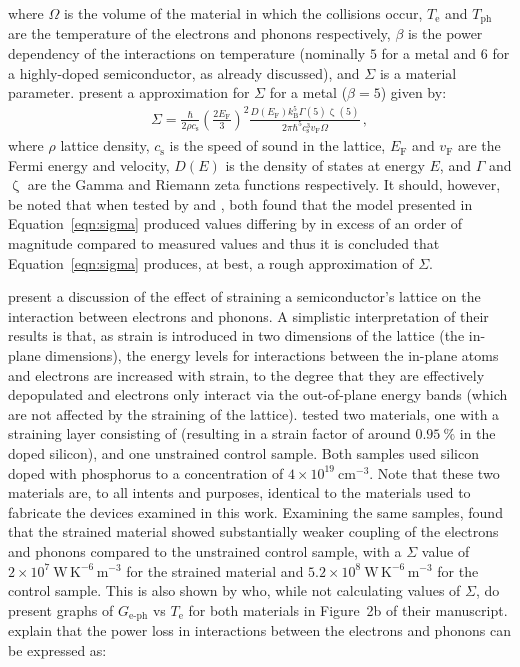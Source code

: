 where $\varOmega$ is the volume of the material in which the collisions occur, $T_{\mathrm{e}}$ and $T_{\mathrm{ph}}$ are the temperature of the electrons and phonons respectively, $\beta$ is the power dependency of the interactions on temperature (nominally $5$ for a metal and $6$ for a highly-doped semiconductor, as already discussed), and $\varSigma$ is a material parameter. \textcite{Wellstood1994} present a approximation for $\varSigma$ for a metal ($\beta = 5$) given by:
\begin{align}
\varSigma = \frac{\hbar}{2\rho c_{\mathrm{s}}}
	\left(\frac{2E_{\mathrm{F}}}{3}\right)^{2}
	\frac{D\left(E_{\mathrm{F}}\right)k_{\mathrm{B}}^{5}
		\Gamma\left(5\right)\upzeta\left(5\right)}
		{2\pi\hbar^{5}c_{\mathrm{s}}^{3}v_{\mathrm{F}}\Omega}\,,
\label{eqn:sigma}
\end{align}
where $\rho$ lattice density, $c_{\mathrm{s}}$ is the speed of sound in the lattice, $E_{\mathrm{F}}$ and $v_{\mathrm{F}}$ are the Fermi energy and velocity, $D\left(E\right)$ is the density of states at energy $E$, and $\Gamma$ and $\upzeta$ are the Gamma and Riemann zeta functions respectively. It should, however, be noted that when tested by \textcite{Wellstood1994} and \textcite{Qu2005}, both found that the model presented in Equation~\ref{eqn:sigma} produced values differing by in excess of an order of magnitude compared  to measured values and thus it is concluded that Equation~\ref{eqn:sigma} produces, at best, a rough approximation of $\varSigma$.
\par 
\textcite{Muhonen2011} present a discussion of the effect of straining a semiconductor's lattice on the interaction between electrons and phonons. A simplistic interpretation of their results is that, as strain is introduced in two dimensions of the lattice (the in-plane dimensions), the energy levels for interactions between the in-plane atoms and electrons are increased with strain, to the degree that they are effectively depopulated and electrons only interact via the out-of-plane energy bands (which are not affected by the straining of the lattice). \citeauthor{Muhonen2011} tested two materials, one with a straining layer consisting of  (resulting in a strain factor of around $0.95~\%$ in the doped silicon), and one unstrained control sample. Both samples used silicon doped with phosphorus to a concentration of $4 \times 10^{19}~\mathrm{cm^{-3}}$. Note that these two materials are, to all intents and purposes, identical to the materials used to fabricate the devices examined in this work. Examining the same samples, \textcite{Prest2011} found that the strained material showed substantially weaker coupling of the electrons and phonons compared to the unstrained control sample, with a $\Sigma$ value of $2 \times 10^{7}~\mathrm{W\,K^{-6}\,m^{-3}}$ for the strained material and $5.2 \times 10^{8}~\mathrm{W\,K^{-6}\,m^{-3}}$ for the control sample. This is also shown by \textcite{Muhonen2011} who, while not calculating values of $\Sigma$, do present graphs of $G_{\mathrm{e\mbox{-}ph}}$ vs $T_{\mathrm{e}}$ for both materials in Figure~2b of their manuscript. \citeauthor{Muhonen2011} explain that the power loss in interactions between the electrons and phonons can be expressed as:
